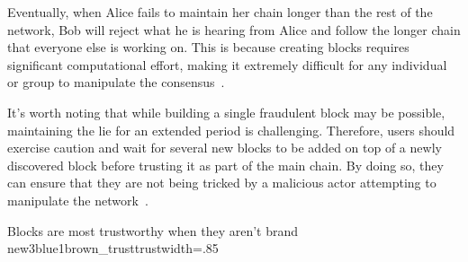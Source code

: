 Eventually, when Alice fails to maintain her chain longer than the rest of the network, Bob will reject what he is hearing
from Alice and follow the longer chain that everyone else is working on. This is because creating blocks requires significant
computational effort, making it extremely difficult for any individual or group to manipulate the consensus~\cite{szabo2005bit}.

It's worth noting that while building a single fraudulent block may be possible, maintaining the lie for an extended period
is challenging. Therefore, users should exercise caution and wait for several new blocks to be added on top of a newly
discovered block before trusting it as part of the main chain. By doing so, they can ensure that they are not being tricked
by a malicious actor attempting to manipulate the network~\cite{dupont2019cryptocurrencies}.

{Blocks are most trustworthy when they aren't brand new}{3blue1brown_trust}{trust}{width=.85\textwidth}%
